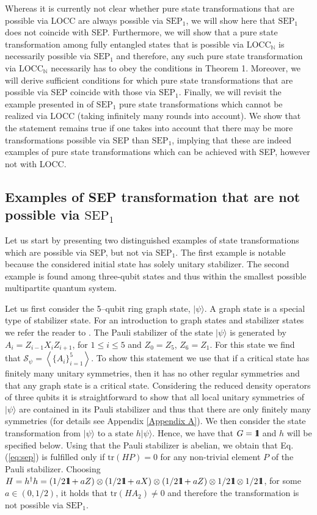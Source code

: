 \documentclass[superscriptaddress,twocolumn]{revtex4}\usepackage[utf8]{inputenc}
\newcommand{\tr}{\text{tr}}
\newcommand{\one}{\mbox{$1 \hspace{-1.0mm}  {\bf l}$}}
\newcommand{\N}{\mathbb{N}}
\newcommand{\ket}[1]{|#1\rangle}
\begin{document}
Whereas it is currently not clear whether pure state transformations that are possible via LOCC are always possible via $\textrm{SEP}_1$, we  will show here that $\textrm{SEP}_1$ does not coincide with SEP. Furthermore, we will show that a pure state transformation among fully entangled states that is possible via $\textrm{LOCC}_\N$ is necessarily possible via $\textrm{SEP}_1$ and therefore, any such pure state transformation via $\textrm{LOCC}_\N$ necessarily has to obey the conditions in Theorem 1. Moreover, we will derive sufficient conditions for which pure state transformations that are possible via SEP coincide with those via $\textrm{SEP}_1$. Finally, we will revisit the example presented in \cite{HeSp16} of  $\textrm{SEP}_1$ pure state transformations which cannot be realized via LOCC (taking infinitely many rounds into account). We show that the  statement remains true if one takes into account that there may be more transformations possible via SEP than $\textrm{SEP}_1$, implying that these are indeed examples of pure state transformations which can be achieved with SEP, however not with LOCC.


\subsection{Examples of SEP transformation that are not possible via $\textrm{SEP}_1$}
\label{sec:examples}
Let us start by presenting two distinguished examples of state transformations which are possible via SEP, but not via $\textrm{SEP}_1$. The first example is notable because the considered initial state has solely unitary stabilizer. The second example is found among three-qubit states and thus within the smallest possible multipartite quantum system.


Let us first consider the 5--qubit ring graph state, $\ket{\psi}$. A graph state is a special type of stabilizer state. For an introduction to graph states and stabilizer states we refer the reader to \cite{HeDu06}. The Pauli stabilizer of the state $\ket{\psi}$ is generated by $A_i=Z_{i-1} X_i Z_{i+1}$, for $1\leq i \leq 5$ and $Z_0=Z_5$, $Z_6=Z_1$. For this state we find that $\mathcal{S}_\psi =\left<\{A_i\}_{i=1}^5\right>$. To show this statement we use that if a critical state has finitely many unitary symmetries, then it has no other regular symmetries \cite{WaNo17} and that any graph state is a critical state. Considering the reduced density operators of three qubits it is straightforward to show that all local unitary symmetries of $\ket{\psi}$ are contained in its Pauli stabilizer and thus that there are only finitely many symmetries (for details see Appendix \ref{Appendix A}). We then consider the state transformation from $\ket{\psi}$ to a state $h\ket{\psi}$. Hence, we have that $G=\one$ and $h$ will be specified below. Using that the Pauli stabilizer is abelian, we obtain that Eq. (\ref{eq:sep}) is fulfilled only if $\tr(H P)=0$ for any non-trivial element $P$ of the Pauli stabilizer. Choosing $H=h^\dagger h= (1/2 \one +a Z)\otimes (1/2 \one +a X)\otimes (1/2 \one+a Z) \otimes 1/2 \one \otimes 1/2 \one$, for some $a\in (0,1/2)$, it holds that $\tr(H A_2)\neq 0$ and therefore the transformation  is not possible via $\textrm{SEP}_1$.
\end{document}
